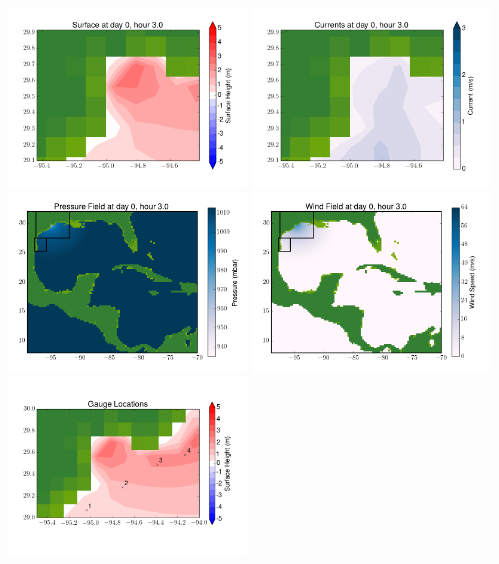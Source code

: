 \documentclass[11pt]{article}
\begin{document}
\includegraphics[width=0.475\textwidth]{frame0075fig6.png}
\vskip 10pt 
\includegraphics[width=0.475\textwidth]{frame0075fig7.png}
\includegraphics[width=0.475\textwidth]{frame0075fig8.png}
\vskip 10pt 
\includegraphics[width=0.475\textwidth]{frame0075fig9.png}
\includegraphics[width=0.475\textwidth]{frame0075fig10.png}
\end{document}
